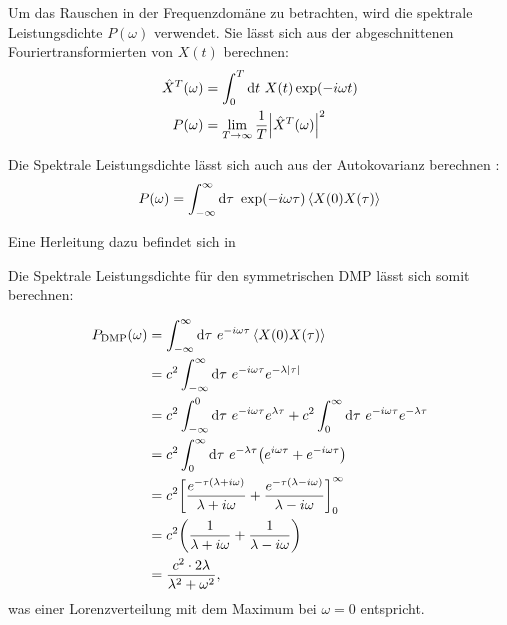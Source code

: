 \documentclass[main.tex]{subfiles}
\begin{document}
Um das Rauschen in der Frequenzdomäne zu betrachten, wird die spektrale
Leistungsdichte \(P(\omega)\) verwendet. Sie lässt sich aus der abgeschnittenen
Fouriertransformierten von \(X(t)\) berechnen:
\begin{align}
	\hat{X}^T(\omega) & = \int_0^T \mathrm{d} t \ X(t) \exp(-i \omega
	t)
	\\
	P(\omega)         & = \lim_{T \to \infty} \frac{1}{T}
	\abs{\hat{X}^T(\omega)}^2
\end{align}

Die Spektrale Leistungsdichte lässt sich auch aus der Autokovarianz berechnen
\cite{Petroni}:
\begin{align}
	P(\omega) = \int_{-\infty}^{\infty} \mathrm{d} \tau \ \exp(-i \omega
	\tau) \expval{X(0) X(\tau)}
\end{align}

Eine Herleitung dazu befindet sich in \cite{Petroni}

Die Spektrale Leistungsdichte für den symmetrischen DMP lässt sich somit
berechnen:

\begin{align}
	P_\text{DMP}(\omega) & = \int_{-\infty}^{\infty} \dif \tau \ e^{-i
			\omega \tau} \expval{X(0)X(\tau)}\nonumber
	\\
	                     & = c^2 \int_{-\infty}^{\infty} \dif \tau \ e^{-i
			\omega
			\tau}e^{-\lambda \abs{\tau}}\nonumber
	\\
	                     & = c^2 \int_{-\infty}^{0} \dif \tau \ e^{-i
			\omega \tau}e^{\lambda
	\tau} + c^2 \int_{0}^{\infty} \dif \tau \ e^{-i \omega \tau}e^{-\lambda
	\tau}\nonumber
	\\
	                     & = c^2 \int_{0}^{\infty} \dif \tau \ e^{-\lambda
			\tau} \qty(e^{i \omega
		\tau} + e^{-i \omega \tau})\nonumber
	\\
	                     & = c^2 \qty[\frac{e^{-\tau(\lambda +
					i\omega)}}{\lambda + i\omega} +
		\frac{e^{-\tau(\lambda - i\omega)}}{\lambda -
			i\omega}]_{0}^{\infty}\nonumber
	\\
	                     & = c^2\qty(\frac{1}{\lambda + i\omega} +
	\frac{1}{\lambda -
		i\omega})\nonumber
	\\
	                     & = \frac{c^2 \cdot 2\lambda}{\lambda^2 +
		\omega^2},
\end{align}
was einer Lorenzverteilung mit dem Maximum bei \(\omega=0\) entspricht.

\end{document}
